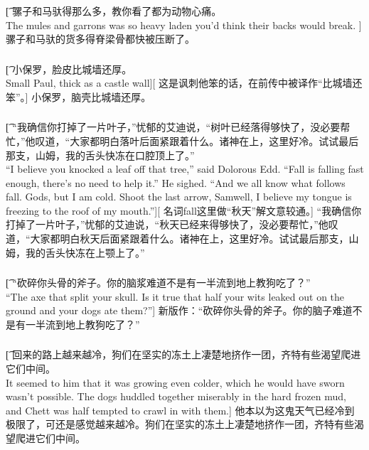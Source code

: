 \documentclass[12pt,a4paper]{article}
\begin{document}
\subsubsection{}\t[	
	骡子和马驮得那么多，教你看了都为动物心痛。\\
	The mules and garrons was so heavy laden you'd think their backs would break. ]
	骡子和马驮的货多得脊梁骨都快被压断了。
	 
 
	
\subsubsection{}\label{3.0.1}\t[
小保罗，脸皮比城墙还厚。\\
Small Paul, thick as a castle wall][
这是讽刺他笨的话，在前传中被译作“比城墙还笨”。]
小保罗，脑壳比城墙还厚。

\subsubsection{}\t[
	“我确信你打掉了一片叶子，”忧郁的艾迪说，“树叶已经落得够快了，没必要帮忙，”他叹道，“大家都明白落叶后面紧跟着什么。诸神在上，这里好冷。试试最后那支，山姆，我的舌头快冻在口腔顶上了。”\\
	“I believe you knocked a leaf off that tree,” said Dolorous Edd. “Fall is falling fast enough, there's no need to help it.” He sighed. “And we all know what follows fall. Gods, but I am cold. Shoot the last arrow, Samwell, I believe my tongue is freezing to the roof of my mouth.”][
	名词fall这里做“秋天”解文意较通。]
	“我确信你打掉了一片叶子，”忧郁的艾迪说，“秋天已经来得够快了，没必要帮忙，”他叹道，“大家都明白秋天后面紧跟着什么。诸神在上，这里好冷。试试最后那支，山姆，我的舌头快冻在上颚上了。”
	
\subsubsection{}\t[
	“砍碎你头骨的斧子。你的脑浆难道不是有一半流到地上教狗吃了？”\\
	“The axe that split your skull. Is it true that half your wits leaked out on the ground and your dogs ate them?”]
	新版作：“砍碎你头骨的斧子。你的脑子难道不是有一半流到地上教狗吃了？”

\subsubsection{}\t[
	回来的路上越来越冷，狗们在坚实的冻土上凄楚地挤作一团，齐特有些渴望爬进它们中间。\\
	It seemed to him that it was growing even colder, which he would have sworn wasn't possible. The dogs huddled together miserably in the hard frozen mud, and Chett was half tempted to crawl in with them.]
	他本以为这鬼天气已经冷到极限了，可还是感觉越来越冷。狗们在坚实的冻土上凄楚地挤作一团，齐特有些渴望爬进它们中间。
	
\end{document}
